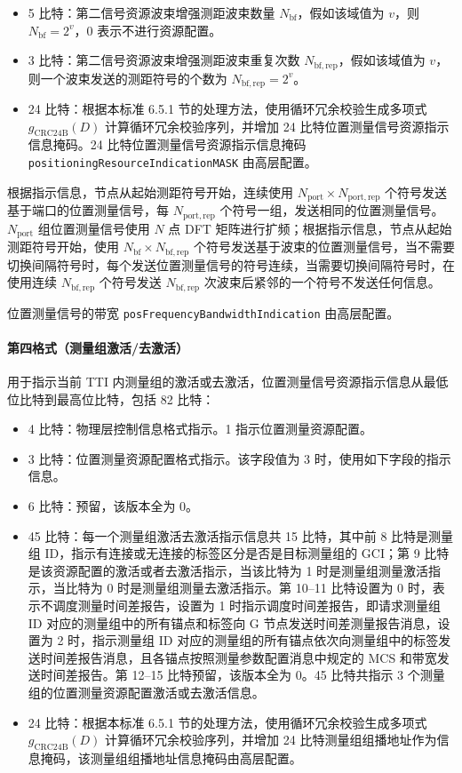 \documentclass[11pt,a4paper]{ctexart}
\begin{document}
\begin{itemize}[nosep]
  \item 5 比特：第二信号资源波束增强测距波束数量 $N_{\mathrm{bf}}$，假如该域值为 $v$，则 $N_{\mathrm{bf}} = 2^v$，0 表示不进行资源配置。
  \item 3 比特：第二信号资源波束增强测距波束重复次数 $N_{\mathrm{bf,rep}}$，假如该域值为 $v$，则一个波束发送的测距符号的个数为 $N_{\mathrm{bf,rep}} = 2^v$。
  \item 24 比特：根据本标准 6.5.1 节的处理方法，使用循环冗余校验生成多项式 $g_{\mathrm{CRC24B}}(D)$ 计算循环冗余校验序列，并增加 24 比特位置测量信号资源指示信息掩码。24 比特位置测量信号资源指示信息掩码 \texttt{positioningResourceIndicationMASK} 由高层配置。
\end{itemize}

根据指示信息，节点从起始测距符号开始，连续使用 $N_{\mathrm{port}} \times N_{\mathrm{port,rep}}$ 个符号发送基于端口的位置测量信号，每 $N_{\mathrm{port,rep}}$ 个符号一组，发送相同的位置测量信号。$N_{\mathrm{port}}$ 组位置测量信号使用 $N$ 点 DFT 矩阵进行扩频；根据指示信息，节点从起始测距符号开始，使用 $N_{\mathrm{bf}} \times N_{\mathrm{bf,rep}}$ 个符号发送基于波束的位置测量信号，当不需要切换间隔符号时，每个发送位置测量信号的符号连续，当需要切换间隔符号时，在使用连续 $N_{\mathrm{bf,rep}}$ 个符号发送 $N_{\mathrm{bf,rep}}$ 次波束后紧邻的一个符号不发送任何信息。

位置测量信号的带宽 \texttt{posFrequencyBandwidthIndication} 由高层配置。

\paragraph{第四格式（测量组激活/去激活）}

用于指示当前 TTI 内测量组的激活或去激活，位置测量信号资源指示信息从最低位比特到最高位比特，包括 82 比特：
\begin{itemize}[nosep]
  \item 4 比特：物理层控制信息格式指示。1 指示位置测量资源配置。
  \item 3 比特：位置测量资源配置格式指示。该字段值为 3 时，使用如下字段的指示信息。
  \item 6 比特：预留，该版本全为 0。
  \item 45 比特：每一个测量组激活去激活指示信息共 15 比特，其中前 8 比特是测量组 ID，指示有连接或无连接的标签区分是否是目标测量组的 GCI；第 9 比特是该资源配置的激活或者去激活指示，当该比特为 1 时是测量组测量激活指示，当比特为 0 时是测量组测量去激活指示。第 10--11 比特设置为 0 时，表示不调度测量时间差报告，设置为 1 时指示调度时间差报告，即请求测量组 ID 对应的测量组中的所有锚点和标签向 G 节点发送时间差测量报告消息，设置为 2 时，指示测量组 ID 对应的测量组的所有锚点依次向测量组中的标签发送时间差报告消息，且各锚点按照测量参数配置消息中规定的 MCS 和带宽发送时间差报告。第 12--15 比特预留，该版本全为 0。45 比特共指示 3 个测量组的位置测量资源配置激活或去激活信息。
  \item 24 比特：根据本标准 6.5.1 节的处理方法，使用循环冗余校验生成多项式 $g_{\mathrm{CRC24B}}(D)$ 计算循环冗余校验序列，并增加 24 比特测量组组播地址作为信息掩码，该测量组组播地址信息掩码由高层配置。
\end{itemize}
\end{document}
